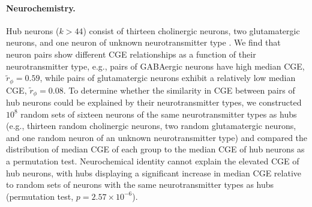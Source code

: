 \documentclass[10pt,letterpaper]{article}
\begin{document}
{%




\paragraph{Neurochemistry.}
Hub neurons ($k > 44$) consist of thirteen cholinergic neurons, two glutamatergic neurons, and one neuron of unknown neurotransmitter type \cite{Pereira:2015er}.
We find that neuron pairs show different CGE relationships as a function of their neurotransmitter type, e.g., pairs of GABAergic neurons have high median CGE, $\tilde{r}_\phi = 0.59$, while pairs of glutamatergic neurons exhibit a relatively low median CGE, $\tilde{r}_\phi = 0.08$.
To determine whether the similarity in CGE between pairs of hub neurons could be explained by their neurotransmitter types, we constructed $10^8$ random sets of sixteen neurons of the same neurotransmitter types as hubs (e.g., thirteen random cholinergic neurons, two random glutamatergic neurons, and one random neuron of an unknown neurotransmitter type) and compared the distribution of median CGE of each group to the median CGE of hub neurons as a permutation test.
Neurochemical identity cannot explain the elevated CGE of hub neurons, with hubs displaying a significant increase in median CGE relative to random sets of neurons with the same neurotransmitter types as hubs (permutation test, $p = 2.57\times10^{-6}$).

}
\end{document}
